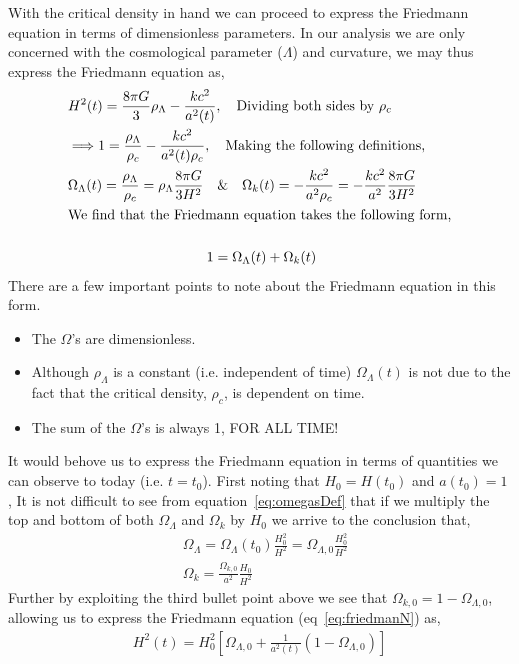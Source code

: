\documentclass[twoside]{article}
\begin{document}
With the critical density in hand we can proceed to express the Friedmann equation in terms of dimensionless parameters. In our analysis we are only concerned with the cosmological parameter ($\Lambda$) and curvature, we may thus express the Friedmann equation as,
\begin{align}
& H^{2}(t) = \frac{8\pi G}{3}\rho_{\Lambda}-\frac{kc^{2}}{a^{2}(t)},\quad \text{Dividing both sides by $\rho_{c}$} \\
&\Longrightarrow 1 = \frac{\rho_{\Lambda}}{\rho_{c}} -\frac{kc^{2}}{a^{2}(t)\rho_{c}},\quad \text{Making the following definitions,}\\
&\Omega_{\Lambda}(t) = \frac{\rho_{\Lambda}}{\rho_{c}} = \rho_{\Lambda}\frac{8\pi G}{3H^{2}}\quad\&\quad\Omega_{k} (t)= -\frac{kc^{2}}{a^{2}\rho_{c}} = -\frac{kc^{2}}{a^{2}}\frac{8\pi G}{3H^{2}}\label{eq:omegasDef}\\
 & \text{We find that the Friedmann equation takes the following form,}\notag\\\notag\\
&\hspace{3.5cm} 1=\Omega_{\Lambda}(t)+\Omega_{k}(t) 
\end{align}\label{eq:friedmanN}
There are a few important points to note about the Friedmann equation in this form. 
\begin{itemize}
\item The $\Omega$'s are dimensionless.
\item Although $\rho_{\Lambda}$ is a constant (i.e. independent of time) $\Omega_{\Lambda}(t)$ is not due to the fact that the critical density, $\rho_{c}$, is dependent on time. 
\item The sum of the $\Omega$'s is always 1, FOR ALL TIME!
\end{itemize}
It would behove us to express the Friedmann equation in terms of quantities we can observe to today (i.e. $t=t_{0}$). First noting that $H_{0} = H(t_{0})$ and $a(t_{0}) = 1$ , It is not difficult to see from equation~\ref{eq:omegasDef} that if we multiply  the top and bottom of both $\Omega_{\Lambda}$ and $\Omega_{k}$ by $H_{0}$ we arrive to the conclusion that, 
\begin{align}
&\Omega_{\Lambda} = \Omega_{\Lambda}(t_{0})\frac{H^{2}_{0}}{H^{2}} = \Omega_{\Lambda,0}\frac{H^{2}_{0}}{H^{2}}\label{eq:omegLamb1}\\
&\Omega_{k} = \frac{\Omega_{k,0}}{a^2}\frac{H_{0}}{H^{2}}
\end{align}
Further by exploiting the third bullet point above we see that $\Omega_{k,0} = 1-\Omega_{\Lambda,0}$, allowing us to express the Friedmann equation (eq~\ref{eq:friedmanN}) as,
\begin{align}
H^2(t) = H^{2}_{0}\left[\Omega_{\Lambda,0}+\frac{1}{a^{2}(t)}(1-\Omega_{\Lambda,0})\right]\label{eq:fried3}
\end{align}
\end{document}
